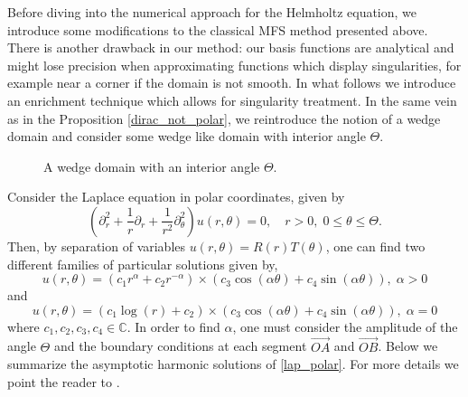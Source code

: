 Before diving into the numerical approach for the Helmholtz equation, we introduce some modifications to the classical MFS method presented above. There is another drawback in our method: our basis functions are analytical and might lose precision when approximating functions which display singularities, for example near a corner if the domain is not smooth. In what follows we introduce an enrichment technique which allows for singularity treatment. In the same vein as in the Proposition \eqref{dirac_not_polar}, we reintroduce the notion of a wedge domain and consider some wedge like domain with interior angle \(\Theta\).
    
\begin{figure}[H]
\centering
{}
\caption{A wedge domain with an interior angle \(\Theta\).}\label{wedge}
\end{figure}
Consider the Laplace equation in polar coordinates, given by
\begin{equation}\label{lap_polar}
    \left(\partial_r^2 + \frac{1}{r} \partial_r +\frac{1}{r^2}\partial_\theta^2\right)u(r,\theta) = 0, \quad r>0, \; 0 \leq \theta \leq \Theta.
\end{equation}
Then, by separation of variables \(u(r, \theta) = R(r) T(\theta)\), one can find two different families of particular solutions given by,
\[
    u(r,\theta) = \left(c_1 r^\alpha + c_2 r^{-\alpha}\right) \times \left(c_3 \cos(\alpha \theta) + c_4 \sin(\alpha \theta)\right), \; \alpha >0
\]
and
\[
    u(r,\theta) = \left(c_1 \log (r) + c_2 \right) \times \left(c_3 \cos(\alpha \theta) + c_4 \sin(\alpha \theta)\right), \; \alpha =0
\]
where \(c_1, c_2, c_3, c_4 \in \mathbb{C}\). In order to find \(\alpha\), one must consider the amplitude of the angle \(\Theta\) and the boundary conditions at each segment \(\overrightarrow{OA}\) and \(\overrightarrow{OB}\). Below we summarize the asymptotic harmonic solutions of \eqref{lap_polar}. For more details we point the reader to \cite{li2000singularities}.

